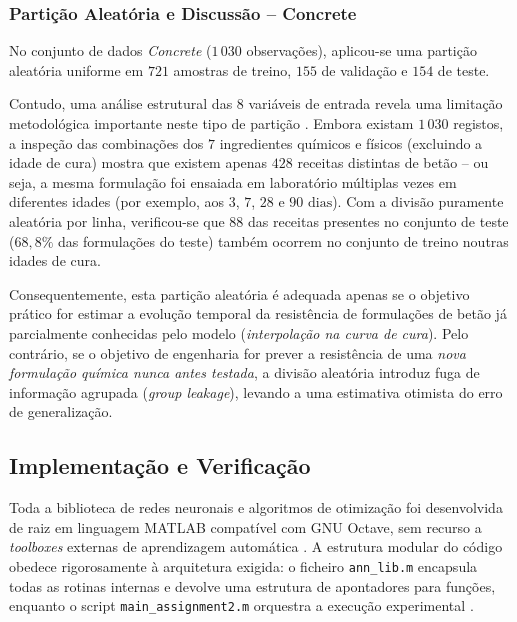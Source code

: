 \documentclass[conference]{IEEEtran}
\begin{document}
\subsubsection{Partição Aleatória e Discussão -- Concrete}
No conjunto de dados \textit{Concrete} ($1\,030$ observações), aplicou-se uma partição aleatória uniforme em $721$ amostras de treino, $155$ de validação e $154$ de teste.

Contudo, uma análise estrutural das $8$ variáveis de entrada revela uma limitação metodológica importante neste tipo de partição \cite{b1}. Embora existam $1\,030$ registos, a inspeção das combinações dos $7$ ingredientes químicos e físicos (excluindo a idade de cura) mostra que existem apenas $428$ receitas distintas de betão -- ou seja, a mesma formulação foi ensaiada em laboratório múltiplas vezes em diferentes idades (por exemplo, aos $3$, $7$, $28$ e $90\text{ dias}$). Com a divisão puramente aleatória por linha, verificou-se que $88$ das receitas presentes no conjunto de teste ($68{,}8\%$ das formulações do teste) também ocorrem no conjunto de treino noutras idades de cura.

Consequentemente, esta partição aleatória é adequada apenas se o objetivo prático for estimar a evolução temporal da resistência de formulações de betão já parcialmente conhecidas pelo modelo (\textit{interpolação na curva de cura}). Pelo contrário, se o objetivo de engenharia for prever a resistência de uma \textit{nova formulação química nunca antes testada}, a divisão aleatória introduz fuga de informação agrupada (\textit{group leakage}), levando a uma estimativa otimista do erro de generalização.

\subsection{Implementação e Verificação}

Toda a biblioteca de redes neuronais e algoritmos de otimização foi desenvolvida de raiz em linguagem MATLAB compatível com GNU Octave, sem recurso a \textit{toolboxes} externas de aprendizagem automática \cite{b1}. A estrutura modular do código obedece rigorosamente à arquitetura exigida: o ficheiro \texttt{ann\_lib.m} encapsula todas as rotinas internas e devolve uma estrutura de apontadores para funções, enquanto o script \texttt{main\_assignment2.m} orquestra a execução experimental \cite{b1}.
\end{document}
